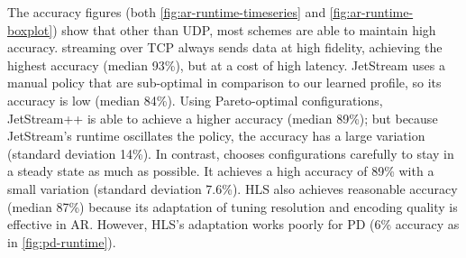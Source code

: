
The accuracy figures (both \autoref{fig:ar-runtime-timeseries} and
\autoref{fig:ar-runtime-boxplot}) show that other than UDP, most schemes are
able to maintain high accuracy. streaming over TCP always sends data at high
fidelity, achieving the highest accuracy (median 93\%), but at a cost of high
latency. JetStream uses a manual policy that are sub-optimal in comparison to
our learned profile, so its accuracy is low (median 84\%). Using Pareto-optimal
configurations, JetStream++ is able to achieve a higher accuracy (median 89\%);
but because JetStream's runtime oscillates the policy, the accuracy has a large
variation (standard deviation 14\%). In contrast, \awstream{} chooses
configurations carefully to stay in a steady state as much as possible.  It
achieves a high accuracy of 89\% with a small variation (standard deviation
7.6\%). HLS also achieves reasonable accuracy (median 87\%) because its
adaptation of tuning resolution and encoding quality is effective in
AR. However, HLS's adaptation works poorly for PD (6\% accuracy as in
\autoref{fig:pd-runtime}).


